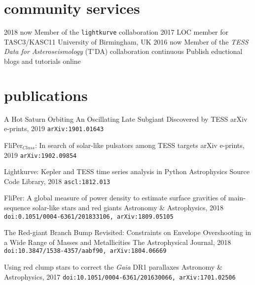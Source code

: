 \documentclass[]{k-cv} %
\begin{document}
\section{community services}
\begin{entrylist}
\entrythree
{2018 \to now}
{Member of the \texttt{lightkurve} collaboration}
{}
\entrythree
{2017}
{LOC member for TASC3/KASC11}
{University of Birmingham, UK}
\entrythree
{2016 \to now}
{Member of the \emph{TESS Data for Asteroseismology} (T'DA) collaboration }
{}
\entrythree
{continuous}
{Publish eductional blogs and tutorials online}
{}
\end{entrylist}
\section{publications}
{{A Hot Saturn Orbiting An Oscillating Late Subgiant Discovered by TESS}}
{arXiv e-prints, 2019}
{\texttt{arXiv:1901.01643}}

{FliPer$_{Class}$: In search of solar-like pulsators among TESS targets}
{arXiv e-prints, 2019}
{\texttt{arXiv:1902.09854}}

{Lightkurve: Kepler and TESS time series analysis in Python}
{Astrophysics Source Code Library, 2018}
{\texttt{ascl:1812.013}}

{FliPer: A global measure of power density to estimate surface gravities of main-sequence solar-like stars and red giants}
{Astronomy \& Astrophysics, 2018}
{\texttt{doi:0.1051/0004-6361/201833106, arXiv:1809.05105}}

{The Red-giant Branch Bump Revisited: Constraints on Envelope Overshooting in a Wide Range of Masses and Metallicities}
{The Astrophysical Journal, 2018}
{\texttt{doi:10.3847/1538-4357/aabf90, arXiv:1804.06669}}

{Using red clump stars to correct the \emph{Gaia} DR1 parallaxes}
{Astronomy \& Astrophysics, 2017}
{\texttt{doi:10.1051/0004-6361/201630066, arXiv:1701.02506}}
\end{document}
